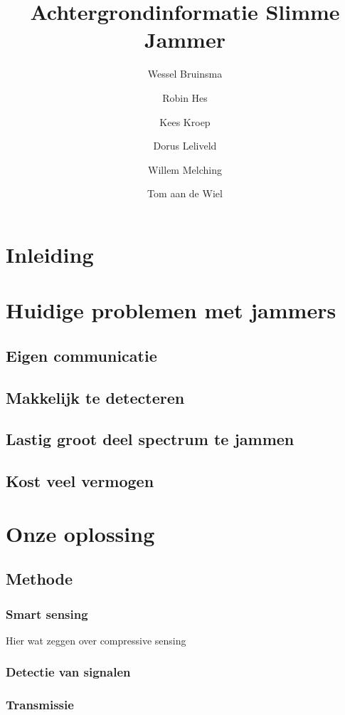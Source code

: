 \documentclass[oneside, a4paper, openany]{article}
\title{Achtergrondinformatie Slimme Jammer}
\author{Wessel Bruinsma \and Robin Hes \and Kees Kroep \and Dorus Leliveld \and Willem Melching \and Tom aan de Wiel}
\begin{document}
\maketitle

\clearpage

\tableofcontents

\clearpage

\section{Inleiding}

\section{Huidige problemen met jammers}
\subsection{Eigen communicatie}
\subsection{Makkelijk te detecteren}
\subsection{Lastig groot deel spectrum te jammen}
\subsection{Kost veel vermogen}


\section{Onze oplossing}
\subsection{Methode}
\subsubsection{Smart sensing}
Hier wat zeggen over compressive sensing
\subsubsection{Detectie van signalen}
\subsubsection{Transmissie}
\end{document}
